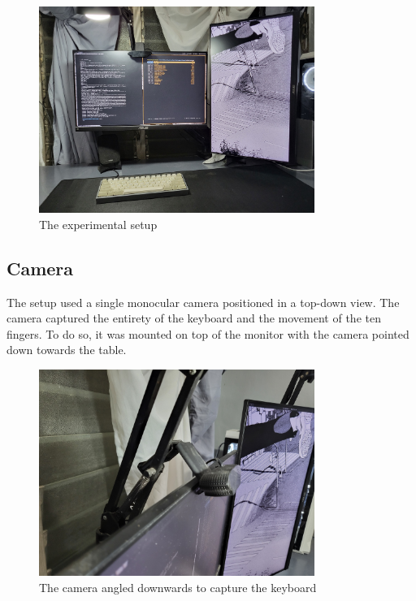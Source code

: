 \documentclass{report}
\begin{document}
\begin{figure}[H]
	\centering
	\includegraphics[width=0.8\textwidth]{full-setup.jpg}
	\caption{The experimental setup}
	\label{fig:metho-setup}
	\centering
\end{figure}

\subsection{Camera}
The setup used a single monocular camera positioned in a top-down view. The
camera captured the entirety of the keyboard and the movement of the ten
fingers. To do so, it was mounted on top of the monitor with the camera pointed
down towards the table.

\begin{figure}[H]
	\centering
	\includegraphics[width=0.8\textwidth]{camera-placement.jpg}
	\caption{The camera angled downwards to capture the keyboard}
	\label{fig:metho-setup-camera-placement}
\end{figure}
\end{document}
